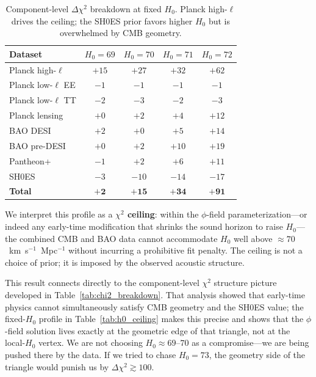 \documentclass[a4paper,11pt]{article}
\begin{document}
\begin{table}[ht]
\centering
\caption{Component-level $\Delta\chi^2$ breakdown at fixed $H_0$. Planck high-$\ell$ drives the ceiling; the SH0ES prior favors higher $H_0$ but is overwhelmed by CMB geometry.}
\label{tab:ceiling_breakdown}
\begin{tabular}{lcccc}
\toprule
Dataset & $H_0=69$ & $H_0=70$ & $H_0=71$ & $H_0=72$ \\
\midrule
Planck high-$\ell$ & $+15$ & $+27$ & $+32$ & $+62$ \\
Planck low-$\ell$ EE & $-1$ & $-1$ & $-1$ & $-1$ \\
Planck low-$\ell$ TT & $-2$ & $-3$ & $-2$ & $-3$ \\
Planck lensing & $+0$ & $+2$ & $+4$ & $+12$ \\
BAO DESI & $+2$ & $+0$ & $+5$ & $+14$ \\
BAO pre-DESI & $+0$ & $+2$ & $+10$ & $+19$ \\
Pantheon+ & $-1$ & $+2$ & $+6$ & $+11$ \\
SH0ES & $-3$ & $-10$ & $-14$ & $-17$ \\
\midrule
\textbf{Total} & $\mathbf{+2}$ & $\mathbf{+15}$ & $\mathbf{+34}$ & $\mathbf{+91}$ \\
\bottomrule
\end{tabular}
\end{table}

We interpret this profile as a \textbf{$\chi^2$ ceiling}: within the $\phi$-field parameterization---or indeed any early-time modification that shrinks the sound horizon to raise $H_0$---the combined CMB and BAO data cannot accommodate $H_0$ well above $\approx 70$~km~s$^{-1}$~Mpc$^{-1}$ without incurring a prohibitive fit penalty. The ceiling is not a choice of prior; it is imposed by the observed acoustic structure.

This result connects directly to the component-level $\chi^2$ structure picture developed in Table~\ref{tab:chi2_breakdown}. That analysis showed that early-time physics cannot simultaneously satisfy CMB geometry and the SH0ES value; the fixed-$H_0$ profile in Table~\ref{tab:h0_ceiling} makes this precise and shows that the $\phi$-field solution lives exactly at the geometric edge of that triangle, not at the local-$H_0$ vertex. We are not choosing $H_0 \approx 69$--$70$ as a compromise---we are being pushed there by the data. If we tried to chase $H_0 = 73$, the geometry side of the triangle would punish us by $\Delta\chi^2 \gtrsim 100$.
\end{document}
